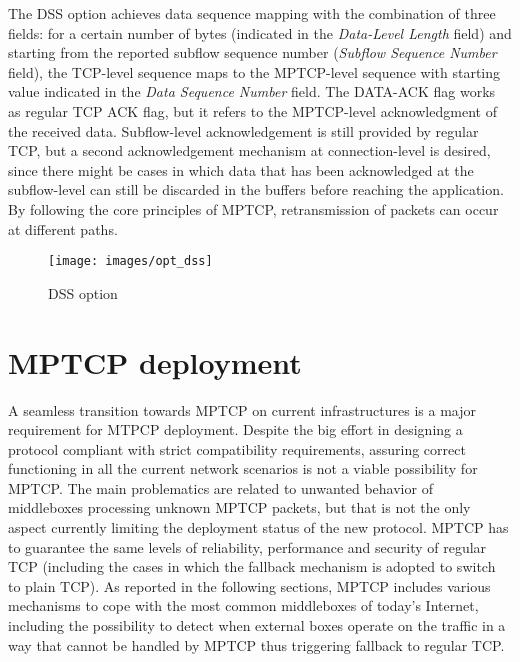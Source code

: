 The DSS option achieves data sequence mapping with the combination of three fields: for a certain number of bytes (indicated in the \textit{Data-Level Length} field) and starting from the reported subflow sequence number (\textit{Subflow Sequence Number} field), the TCP-level sequence maps to the MPTCP-level sequence with starting value indicated in the \textit{Data Sequence Number} field.
The DATA-ACK flag works as regular TCP ACK flag, but it refers to the MPTCP-level acknowledgment of the received data. Subflow-level acknowledgement is still provided by regular TCP, but a second acknowledgement mechanism at connection-level is desired, since there might be cases in which data that has been acknowledged at the subflow-level can still be discarded in the buffers before reaching the application. By following the core principles of MPTCP, retransmission of packets can occur at different paths.

\begin{figure}[!htb]
\centering
\texttt{[image: images/opt\_dss]}
\caption{DSS option}
\label{fig:opt_dss}
\end{figure}

\section{MPTCP deployment}
A seamless transition towards MPTCP on current infrastructures is a major requirement for MTPCP deployment.
Despite the big effort in designing a protocol compliant with strict compatibility requirements, assuring correct functioning in all the current network scenarios is not a viable possibility for MPTCP. The main problematics are related to unwanted behavior of middleboxes processing unknown MPTCP packets, but that is not the only aspect currently limiting the deployment status of the new protocol. MPTCP has to guarantee the same levels of reliability, performance and security of regular TCP (including the cases in which the fallback mechanism is adopted to switch to plain TCP). 
As reported in the following sections, MPTCP includes various mechanisms to cope with the most common middleboxes of today's Internet, including the possibility to detect when external boxes operate on the traffic in a way that cannot be handled by MPTCP thus triggering fallback to regular TCP.

